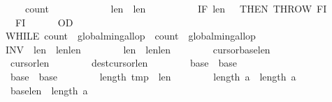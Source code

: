 \begin{isabellebody}
\ \ \ \ \ \ \ \ \ \ {\isasymacute}count{}\ {\isacharcolon}{\isacharequal}{\isacharequal}\ {}{\isacharsemicolon}{\isacharsemicolon}\isanewline
\ \ \ \ \ \ \ \ \ \ {\isasymacute}len{}\ {\isacharcolon}{\isacharequal}{\isacharequal}\ {\isasymacute}len{}{\isacharminus}{}{\isacharsemicolon}{\isacharsemicolon}\isanewline
\ \ \ \ \ \ \ \ \ \ IF\ {\isasymacute}len{}\ {\isacharequal}\ {}\ THEN\ THROW\ FI\isanewline
\ \ \ \ \ \ \ \ FI\isanewline
\ \ \ \ \ \ OD{\isacharsemicolon}{\isacharsemicolon}\isanewline
\ \ \ \ \ \ WHILE\ {\isacharparenleft}{\isasymacute}count{}\ {\isasymge}\ {\isasymacute}global{\isacharunderscore}min{\isacharunderscore}gallop\ {\isacharbar}\ {\isasymacute}count{}\ {\isasymge}\ {\isasymacute}global{\isacharunderscore}min{\isacharunderscore}gallop{\isacharparenright}\isanewline
\ \ \ \ \ \ INV\ {\isasymlbrace}\ {\isasymacute}len{}{\isachargreater}{}\ {\isasymand}\ {\isasymacute}len{}{\isacharless}\isactrlbsup {\isasymsigma}\isactrlesup len{}\ {\isasymand}\isanewline
\ \ \ \ \ \ \ {\isasymacute}len{}{\isachargreater}{}\ {\isasymand}\ {\isasymacute}len{}{\isasymle}\isactrlbsup {\isasymsigma}\isactrlesup len{}\ {\isasymand}\isanewline
\ \ \ \ \ \ \ {\isasymacute}cursor{}{\isacharplus}{}{\isacharequal}{\isasymacute}base{}{\isacharplus}{\isasymacute}len{}\ {\isasymand}\isanewline
\ \ \ \ \ \ \ {\isasymacute}cursor{}{\isacharplus}{}{\isacharequal}{\isasymacute}len{}\ {\isasymand}\isanewline
\ \ \ \ \ \ \ {\isasymacute}dest{\isacharequal}{\isasymacute}cursor{}{\isacharplus}{\isasymacute}len{}\ {\isasymand}\isanewline
\ \ \ \ \ \ \ {\isasymacute}base{}\ {\isacharequal}\ \isactrlbsup {\isasymsigma}\isactrlesup base{}\ {\isasymand}\isanewline
\ \ \ \ \ \ \ {\isasymacute}base{}\ {\isacharequal}\ \isactrlbsup {\isasymsigma}\isactrlesup base{}\ {\isasymand}\isanewline
\ \ \ \ \ \ \ length\ {\isasymacute}tmp\ {\isacharequal}\ \isactrlbsup {\isasymsigma}\isactrlesup len{}\ {\isasymand}\isanewline
\ \ \ \ \ \ \ length\ {\isasymacute}a\ {\isacharequal}\ length\ \isactrlbsup {\isasymsigma}\isactrlesup a\ {\isasymand}\isanewline
\ \ \ \ \ \ \ {\isacharparenleft}\isactrlbsup {\isasymsigma}\isactrlesup base{}{\isacharplus}\isactrlbsup {\isasymsigma}\isactrlesup len{}\ {\isasymle}\ length\ \isactrlbsup {\isasymsigma}\isactrlesup a{\isacharparenright}\ {\isasymand}\isanewline

\end{isabellebody}
